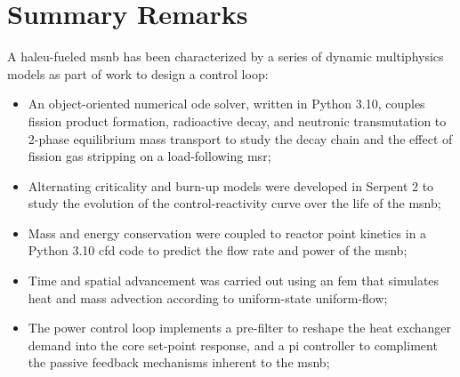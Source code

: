 \section{Summary Remarks}
A \acs{haleu}-\UF fueled \acs{msnb} has been characterized by a series of dynamic multiphysics models as part of work to design a control loop:
\begin{itemize}
    \item An object-oriented numerical \acs{ode} solver, written in Python 3.10, couples fission product formation, radioactive decay, and neutronic transmutation to 2-phase equilibrium mass transport to study the \Xe decay chain and the effect of fission gas stripping on a load-following \acs{msr};
    \item Alternating criticality and burn-up models were developed in Serpent 2 to study the evolution of the control-reactivity curve over the life of the \acs{msnb};
    \item Mass and energy conservation were coupled to reactor point kinetics in a Python 3.10 \acs{cfd} code to predict the flow rate and power of the \acs{msnb};
    \item Time and spatial advancement was carried out using an \acs{fem} that simulates heat and mass advection according to uniform-state uniform-flow;
    \item The power control loop implements a pre-filter to reshape the heat exchanger demand into the core set-point response, and a \acs{pi} controller to compliment the passive feedback mechanisms inherent to the \acs{msnb};
\end{itemize}

